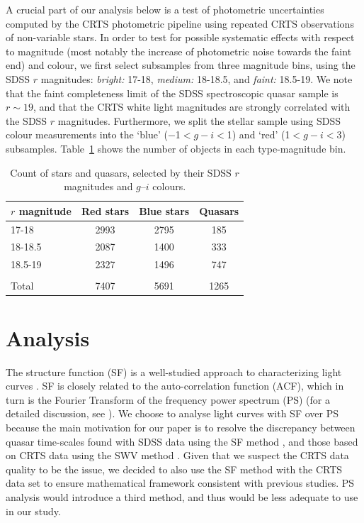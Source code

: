 \documentclass[fleqn,usenatbib]{mnras}
\begin{document}
A crucial part of our analysis below is a test of photometric uncertainties computed by the CRTS photometric
pipeline using repeated CRTS observations of non-variable stars. In order to test for possible systematic
effects with respect to magnitude (most notably the increase of photometric noise towards
the faint end) and colour, we first select  subsamples from three magnitude bins, using the SDSS $r$ magnitudes: 
{\it bright:} 17-18,  {\it medium:} 18-18.5, and {\it faint:} 18.5-19. We note that the faint completeness limit 
of the SDSS spectroscopic quasar sample is $r\sim19$, and that the CRTS white light magnitudes are strongly
correlated with the SDSS $r$ magnitudes. Furthermore, we split the stellar sample using SDSS colour measurements
into the `blue' ($-$1$<g-i<$1) and `red' (1$<g-i<$3) subsamples. Table~\ref{tab:object_count} shows the 
number of objects in each type-magnitude bin.  



\begin{table}
\centering
\begin{threeparttable}
\caption{Count of stars and quasars, selected by their SDSS $r$ magnitudes and $g$--$i$ colours.}
\label{tab:object_count}
\begin{tabular}{ lccc} 
\hline
$r$ magnitude & Red stars & Blue stars & Quasars \\ 
\hline
17-18   & 2993 & 2795   & 185    \\ 
18-18.5 & 2087 &  1400  & 333   \\ 
18.5-19 & 2327 &  1496  & 747   \\
& & & \\
Total   & 7407 &  5691 & 1265 \\
\hline
\end{tabular}
\end{threeparttable}
\end{table}
 


\section{Analysis}
\label{sec:analysis}

The structure function (SF) is a well-studied approach to characterizing light curves \citep{2004Ivezic, berk2004, devries2005, macleod2010, graham2013, kozlowski2016}. SF is closely related to the auto-correlation function (ACF), which in turn is the Fourier Transform of the  frequency power spectrum (PS) (for a detailed discussion,  see \citealt{ivezic2014,kozlowski2016}). We choose to analyse light curves with SF over PS because the main motivation for our paper is to resolve the discrepancy between quasar time-scales  found with SDSS data using the SF method \citep{macleod2010, macleod2011, macleod2012}, and those based on CRTS data using the SWV method \citep{graham2014}.  Given that we suspect the CRTS data quality to be the issue, we decided to also use the SF method with the CRTS data set to ensure mathematical framework consistent with previous studies. PS analysis would introduce a third method, and thus would be less adequate to use in our study.  
\end{document}
